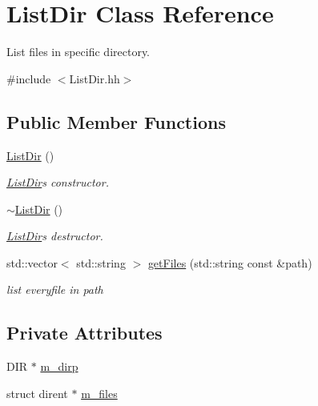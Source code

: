 \hypertarget{class_list_dir}{}\section{List\+Dir Class Reference}
\label{class_list_dir}


List files in specific directory.  




{\ttfamily \#include $<$List\+Dir.\+hh$>$}

\subsection*{Public Member Functions}
\begin{DoxyCompactItemize}
\item 
\hyperlink{class_list_dir_aac92fbdf95091015a84a9daa284d610b}{List\+Dir} ()
\begin{DoxyCompactList}\small\item\em \hyperlink{class_list_dir}{List\+Dir}\textquotesingle{}s constructor. \end{DoxyCompactList}\item 
\hypertarget{class_list_dir_ae7e13336b2eb093202570642a6931dbf}{}\hyperlink{class_list_dir_ae7e13336b2eb093202570642a6931dbf}{$\sim$\+List\+Dir} ()\label{class_list_dir_ae7e13336b2eb093202570642a6931dbf}

\begin{DoxyCompactList}\small\item\em \hyperlink{class_list_dir}{List\+Dir}\textquotesingle{}s destructor. \end{DoxyCompactList}\item 
std\+::vector$<$ std\+::string $>$ \hyperlink{class_list_dir_ae80828ed7f47ac09e17cc05735c257a9}{get\+Files} (std\+::string const \&path)
\begin{DoxyCompactList}\small\item\em list everyfile in path \end{DoxyCompactList}\end{DoxyCompactItemize}
\subsection*{Private Attributes}
\begin{DoxyCompactItemize}
\item 
D\+I\+R $\ast$ \hyperlink{class_list_dir_aaa998893571e65c0f82c129c52543148}{m\+\_\+dirp}
\item 
struct dirent $\ast$ \hyperlink{class_list_dir_ad5c1cab9f4223840352773b289640d25}{m\+\_\+files}
\end{DoxyCompactItemize}


